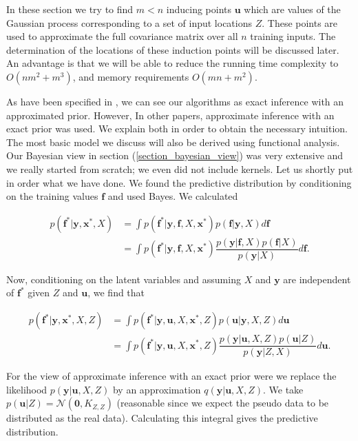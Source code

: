 \documentclass[12pt,a4paper,oneside]{book}
\begin{document}
In these section we try to find $m < n$ inducing points $\bm{u}$ which are values of the Gaussian process corresponding to a set of input locations $Z$. These points are used to approximate the full covariance matrix over all $n$ training inputs. The determination of the locations of these induction points will be discussed later. An advantage is that we will be able to reduce the running time complexity to $O(nm^2+ m^3)$, and memory requirements $O(mn+m^2)$. 

As have been specified in \cite{quinonero2005unifying}, we can see our algorithms as exact inference with an approximated prior. However, In other papers, approximate inference with an exact prior was used. We explain both in order to obtain the necessary intuition. The most basic model we discuss will also be derived using functional analysis. Our Bayesian view in section (\ref{section_bayesian_view}) was very extensive and we really started from scratch; we even did not include kernels. Let us shortly put in order what we have done. We found the predictive distribution by conditioning on the training values $\bm{f}$ and used Bayes. We calculated

\begin{align}\label{integraal}
p(\bm{f}^{\ast}|\bm{y}, \bm{x}^{\ast}, X) &= \int p(\bm{f}^{\ast} | \bm{y}, \bm{f},X, \bm{x}^{\ast}) p(\bm{f} | \bm{y}, X)d\bm{f} \\
 &= \int p(\bm{f}^{\ast} | \bm{y}, \bm{f}, X, \bm{x}^{\ast}) \dfrac{p(\bm{y} |  \bm{f}, X) p(\bm{f}| X )}{ p(\bm{y}| X)} d\bm{f}.
\end{align}


Now, conditioning on the latent variables and assuming $X$ and $\bm{y}$ are independent of $\bm{f}^{\ast}$ given $Z$ and $\bm{u}$, we find that

\begin{align}\label{approximate_llh}
p(\bm{f}^{\ast}|\bm{y}, \bm{x}^{\ast}, X, Z) &= \int p(\bm{f}^{\ast} | \bm{y}, \bm{u},X, \bm{x}^{\ast},Z) p(\bm{u} | \bm{y}, X,Z)d\bm{u} \\
 &= \int p(\bm{f}^{\ast} | \bm{y}, \bm{u},X,\bm{x}^{\ast}, Z) \dfrac{p(\bm{y} | \bm{u}, X,Z) p(\bm{u}| Z )}{ p(\bm{y}| Z,X )} d\bm{u}.
\end{align}

For the view of approximate inference with an exact prior were we replace the likelihood $p(\bm{y} | \bm{u}, X,Z)$ by an approximation  $q(\bm{y} | \bm{u}, X,Z)$. We take $p(\bm{u}|Z) = \mathcal{N}(\bm{0},K_{Z,Z})$ (reasonable since we expect the pseudo data to be distributed as the real data). Calculating this integral gives the predictive distribution. 
\end{document}
